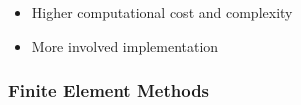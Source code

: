 \begin{frame}
\begin{multicols}{2}
\begin{center}
            \begin{itemize}
                \color{\concolor}
                \item Higher computational cost and complexity
                \item More involved implementation
            \end{itemize}
        \end{center}
    \end{multicols}
    \vspace*{\fill}
    
\end{frame}

\begin{frame}
    \frametitle{Finite Element Methods}

    
\end{frame}